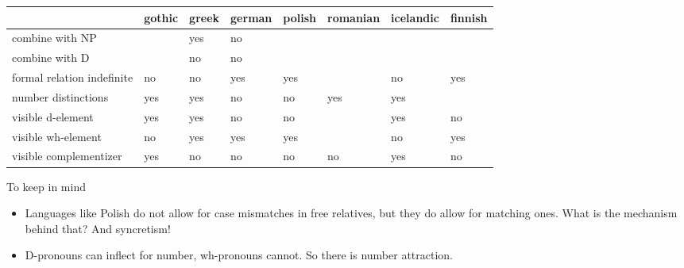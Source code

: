 
\appendix

\begin{table}[h]
	\begin{tabular}{|l|l|l|l|l|l|l|l|}
		\hline
		& gothic & greek & german & polish & romanian & icelandic & finnish													\\ \hline
		combine with NP            &        & yes   & no     &        &          &           & 			\\ \hline
		combine with D             &        & no    & no     &        &          &           & 			\\ \hline
		formal relation indefinite & no     & no    & yes    & yes    &          & no        & yes 	\\ \hline
		number distinctions        & yes    & yes   & no     & no     & yes      & yes       & 			\\ \hline
		visible d-element          & yes    & yes   & no     & no     &          & yes       & no 	\\ \hline
		visible wh-element         & no     & yes   & yes    & yes    &          & no        & yes 	\\ \hline
		visible complementizer     & yes   & no    & no     & no     & no       & yes       & no 	\\ \hline
	\end{tabular}
\end{table}

To keep in mind

\begin{itemize}
	\item Languages like Polish do not allow for case mismatches in free relatives, but they do allow for matching ones. What is the mechanism behind that? And syncretism!
	\item D-pronouns can inflect for number, wh-pronouns cannot. So there is number attraction.
\end{itemize}
